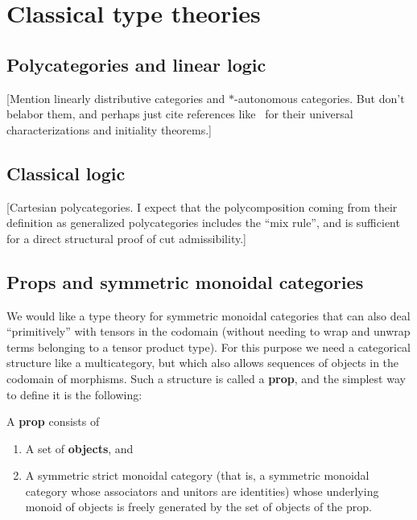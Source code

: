 \chapter{Classical type theories}
\label{chap:polycats}


\section{Polycategories and linear logic}
\label{sec:cllin}

[Mention linearly distributive categories and $\ast$-autonomous categories.
But don't belabor them, and perhaps just cite references like~\cite{cs:wkdistrib} for their universal characterizations and initiality theorems.]


\section{Classical logic}
\label{sec:classical}

[Cartesian polycategories.  I expect that the polycomposition coming from their definition as generalized polycategories includes the ``mix rule'', and is sufficient for a direct structural proof of cut admissibility.]


\section{Props and symmetric monoidal categories}
\label{sec:prop-smc}

We would like a type theory for symmetric monoidal categories that can also deal ``primitively'' with tensors in the codomain (without needing to wrap and unwrap terms belonging to a tensor product type).
For this purpose we need a categorical structure like a multicategory, but which also allows sequences of objects in the codomain of morphisms.
Such a structure is called a \textbf{prop}, and the simplest way to define it is the following:

\begin{defn}\label{defn:prop}
  A \textbf{prop} consists of
  \begin{enumerate}
  \item A set of \textbf{objects}, and
  \item A symmetric strict monoidal category (that is, a symmetric monoidal category whose associators and unitors are identities) whose underlying monoid of objects is freely generated by the set of objects of the prop.\label{item:prop2}
  \end{enumerate}
\end{defn}


